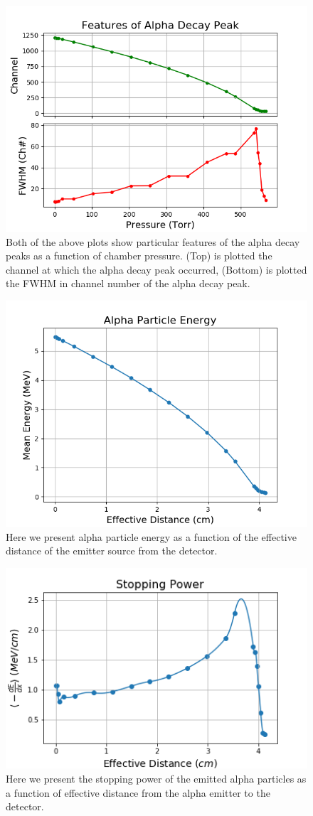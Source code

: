\documentclass[10pt,aps,prb,twocolumn, nofootinbib]{revtex4-1}
\begin{document}
\begin{figure}[h!]
	\includegraphics[width=.5\textwidth,keepaspectratio]{alf_peak_feat.png}
	\caption{Both of the above plots show particular features of the alpha decay peaks as a function of chamber pressure. (Top) is plotted the channel at which the alpha decay peak occurred, (Bottom) is plotted the FWHM in channel number of the alpha decay peak.  \label{alph_decay_feat}}
\end{figure} 

\begin{figure}[h!]
	\includegraphics[width=.5\textwidth,keepaspectratio]{alph_energy.png}
	\caption{Here we present alpha particle energy as a function of the effective distance of the emitter source from the detector. \label{alph_energy}}
\end{figure} 

\begin{figure}[h!]
	\includegraphics[width=.5\textwidth,keepaspectratio]{stop_pwr.png}
	\caption{Here we present the stopping power of the emitted alpha particles as a function of effective distance from the alpha emitter to the detector. \label{stop_pwr}}
\end{figure} 
\end{document}
